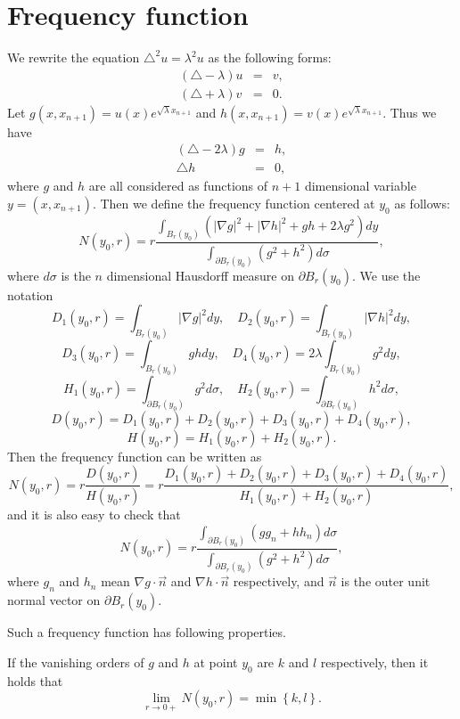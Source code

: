 \documentclass[a4paper, 12pt, onecolumn]{article} \textwidth 148mm
\begin{document}
\section{Frequency function}
We rewrite the equation $\triangle^2u=\lambda^2u$ as the following forms:
\begin{eqnarray*}
(\triangle-\lambda)u&=&v,\\
(\triangle+\lambda)v&=&0.
\end{eqnarray*}
Let $g(x,x_{n+1})=u(x)e^{\sqrt{\lambda}x_{n+1}}$ and $h(x,x_{n+1})=v(x)e^{\sqrt{\lambda}x_{n+1}}$. Thus we have
\begin{eqnarray*}
(\triangle-2\lambda)g&=&h,\\
\triangle h&=&0,
\end{eqnarray*}
where $g$ and $h$ are all considered as functions of $n+1$ dimensional variable $y=(x,x_{n+1})$.
Then we define the frequency function centered at $y_0$ as follows:
\begin{equation}\label{definition of frequency}
N(y_0,r)=r\frac{\int_{B_r(y_0)}\left(|\nabla g|^2+|\nabla h|^2+gh+2\lambda g^2\right)dy}{\int_{\partial B_r(y_0)}\left(g^2+h^2\right)d\sigma},
\end{equation}
where $d\sigma$ is the $n$ dimensional Hausdorff measure on $\partial B_r(y_0)$. We use the notation
$$
D_1(y_0,r)=\int_{B_r(y_0)}|\nabla g|^2dy,\quad D_2(y_0,r)=\int_{B_r(y_0)}|\nabla h|^2dy,
$$
$$
D_3(y_0,r)=\int_{B_r(y_0)}ghdy,\quad D_4(y_0,r)=2\lambda\int_{B_r(y_0)}g^2dy,
$$
$$
H_1(y_0,r)=\int_{\partial B_r(y_0)}g^2d\sigma,\quad H_2(y_0,r)=\int_{\partial B_r(y_0)}h^2d\sigma,
$$
$$
D(y_0,r)=D_1(y_0,r)+D_2(y_0,r)+D_3(y_0,r)+D_4(y_0,r),
$$
$$
H(y_0,r)=H_1(y_0,r)+H_2(y_0,r).
$$
 Then the frequency function can be written as $$N(y_0,r)=r\frac{D(y_0,r)}{H(y_0,r)}=r\frac{D_1(y_0,r)+D_2(y_0,r)+D_3(y_0,r)+D_4(y_0,r)}{H_1(y_0,r)+H_2(y_0,r)},$$
 and it is also easy to check that
 \begin{equation}\label{another form of frequency}
 N(y_0,r)=r\frac{\int_{\partial B_r(y_0)}(gg_n+hh_n)d\sigma}{\int_{\partial B_r(y_0)}(g^2+h^2)d\sigma},
 \end{equation}
where $g_n$ and $h_n$ mean $\nabla g\cdot \overrightarrow{n}$ and $\nabla h\cdot\overrightarrow{n}$ respectively, and $\overrightarrow{n}$ is the outer unit normal vector on $\partial B_r(y_0)$.

 Such a frequency function has following properties.

 \begin{lemma}\label{vanishing order property for frequency function in tirangle case}
 If the vanishing orders of $g$ and $h$ at point $y_0$ are $k$ and $l$ respectively, then it holds that
 \begin{equation}\label{lemma vanishing order property for frequency function in tirangle case}
 \lim\limits_{r\longrightarrow0+}N(y_0,r)=\min\left\{k,l\right\}.
 \end{equation}
 \end{lemma}
\end{document}
